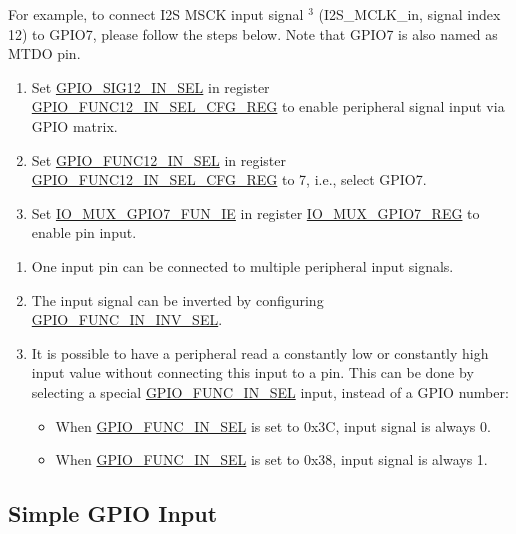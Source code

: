 \documentclass[main\_\_EN.tex]{subfiles}
\begin{document}
For example, to connect I2S MSCK input signal  \hyperref[input-note-3]{$^3$} (I2S\_MCLK\_in, signal index 12) to GPIO7, please follow the steps below. Note that GPIO7 is also named as MTDO pin.

\begin{enumerate}
\item Set  \hyperref[regdesc:GPIOFUNCNINSELCFGREG]{GPIO\_SIG12\_IN\_SEL} in register  \hyperref[fielddesc:GPIOSIGNINSEL]{GPIO\_FUNC12\_IN\_SEL\_CFG\_REG} to enable peripheral signal input via GPIO matrix.
\item Set \hyperref[fielddesc:GPIOFUNCNINSEL]{GPIO\_FUNC12\_IN\_SEL} in register \hyperref[regdesc:GPIOFUNCNINSELCFGREG]{GPIO\_FUNC12\_IN\_SEL\_CFG\_REG} to 7, i.e., select GPIO7.
\item Set \hyperref[fielddesc:IOMUXGPIONFUNIE]{IO\_MUX\_GPIO7\_FUN\_IE} in register \hyperref[regdesc:IOMUXGPIONREG]{IO\_MUX\_GPIO7\_REG} to enable pin input.
\end{enumerate}

\begin{tiplisting}
\vspace{-2em}
\begin{enumerate}
\item \label{input-note-1} One input pin can be connected to multiple peripheral input signals.
\item \label{input-note-2} The input signal can be inverted by configuring \hyperref[fielddesc:GPIOFUNCNININVSEL]{GPIO\_FUNC\_IN\_INV\_SEL}.
\item \label{input-note-3} It is possible to have a peripheral read a constantly low or constantly high input value without connecting this input to a pin. This can be done by selecting a special \hyperref[fielddesc:GPIOFUNCNINSEL]{GPIO\_FUNC\_IN\_SEL} input, instead of a GPIO number:
\begin {itemize}
\item When \hyperref[fielddesc:GPIOFUNCNINSEL]{GPIO\_FUNC\_IN\_SEL} is set to 0x3C, input signal is always 0.
\item When \hyperref[fielddesc:GPIOFUNCNINSEL]{GPIO\_FUNC\_IN\_SEL} is set to 0x38, input signal is always 1.
\end{itemize}
\end{enumerate}
\end{tiplisting}

\subsection{Simple GPIO Input}\label{IOMUXSimpleGPIOInput}
\end{document}
